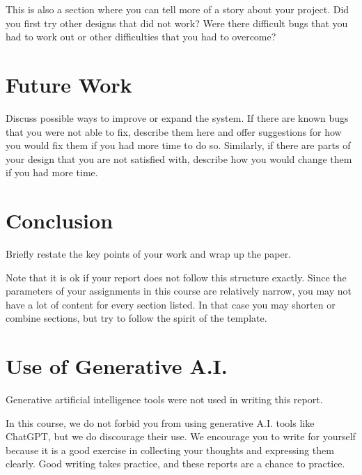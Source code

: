 \documentclass[
	conference,	%
]{IEEEtran}
\begin{document}
This is also a section where you can tell more of a story about your project.
Did you first try other designs that did not work?
Were there difficult bugs that you had to work out
or other difficulties that you had to overcome?


\section{Future Work}
\label{futurework}

Discuss possible ways to improve or expand the system.
If there are known bugs that you were not able to fix,
describe them here and offer suggestions for how you would fix them
if you had more time to do so.
Similarly, if there are parts of your design that you are not satisfied with,
describe how you would change them if you had more time.


\section{Conclusion}
\label{conclusion}

Briefly restate the key points of your work and wrap up the paper.

Note that it is ok if your report does not follow this structure exactly.
Since the parameters of your assignments in this course are relatively narrow,
you may not have a lot of content for every section listed.
In that case you may shorten or combine sections,
but try to follow the spirit of the template.







\appendices


\section{Use of Generative A.I.}

Generative artificial intelligence tools were not used in writing this report.

In this course, we do not forbid you from using generative A.I. tools
like ChatGPT,
but we do discourage their use.
We encourage you to write for yourself because it is a good exercise in
collecting your thoughts and expressing them clearly.
Good writing takes practice, and these reports are a chance to practice.
\end{document}
